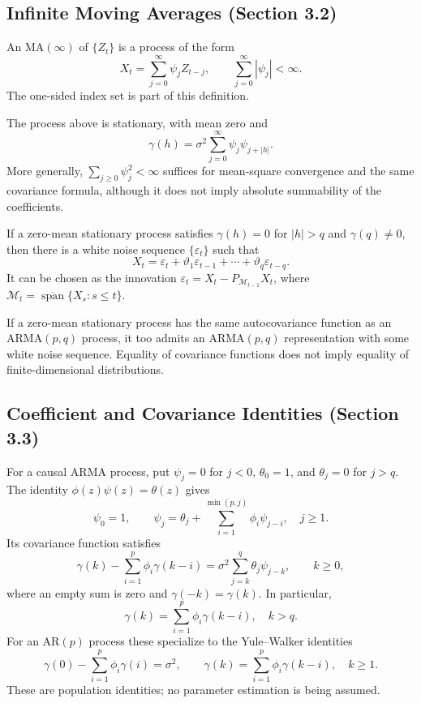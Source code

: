 \subsection{Infinite Moving Averages (Section 3.2)}
\begin{definition}
An $\mathrm{MA}(\infty)$ of $\{Z_t\}$ is a process of the form
\[
X_t=\sum_{j=0}^{\infty}\psi_jZ_{t-j},\qquad
\sum_{j=0}^{\infty}|\psi_j|<\infty.
\]
The one-sided index set is part of this definition.
\end{definition}
\begin{theorem}
The process above is stationary, with mean zero and
\[
\gamma(h)=\sigma^2\sum_{j=0}^{\infty}\psi_j\psi_{j+|h|}.
\]
More generally, $\sum_{j\ge0}\psi_j^2<\infty$ suffices for mean-square
convergence and the same covariance formula, although it does not imply
absolute summability of the coefficients.
\end{theorem}
\begin{proposition}
If a zero-mean stationary process satisfies $\gamma(h)=0$ for $|h|>q$
and $\gamma(q)\ne0$, then there is a white noise sequence $\{\varepsilon_t\}$
such that
\[
X_t=\varepsilon_t+\vartheta_1\varepsilon_{t-1}
+\cdots+\vartheta_q\varepsilon_{t-q}.
\]
It can be chosen as the innovation
$\varepsilon_t=X_t-P_{\mathcal M_{t-1}}X_t$, where
$\mathcal M_t=\overline{\operatorname{span}}\{X_s:s\le t\}$.
\end{proposition}
\begin{corollary}
If a zero-mean stationary process has the same autocovariance function as
an ARMA$(p,q)$ process, it too admits an ARMA$(p,q)$ representation with
some white noise sequence. Equality of covariance functions does not imply
equality of finite-dimensional distributions.
\end{corollary}

\subsection{Coefficient and Covariance Identities (Section 3.3)}
For a causal ARMA process, put $\psi_j=0$ for $j<0$,
$\theta_0=1$, and $\theta_j=0$ for $j>q$. The identity
$\phi(z)\psi(z)=\theta(z)$ gives
\[
\psi_0=1,\qquad
\psi_j=\theta_j+\sum_{i=1}^{\min(p,j)}\phi_i\psi_{j-i},\quad j\ge1.
\]
Its covariance function satisfies
\[
\gamma(k)-\sum_{i=1}^{p}\phi_i\gamma(k-i)
=\sigma^2\sum_{j=k}^{q}\theta_j\psi_{j-k},\qquad k\ge0,
\]
where an empty sum is zero and $\gamma(-k)=\gamma(k)$. In particular,
\[
\gamma(k)=\sum_{i=1}^{p}\phi_i\gamma(k-i),\quad k>q.
\]
For an AR$(p)$ process these specialize to the Yule--Walker identities
\[
\gamma(0)-\sum_{i=1}^{p}\phi_i\gamma(i)=\sigma^2,\qquad
\gamma(k)=\sum_{i=1}^{p}\phi_i\gamma(k-i),\quad k\ge1.
\]
These are population identities; no parameter estimation is being assumed.

